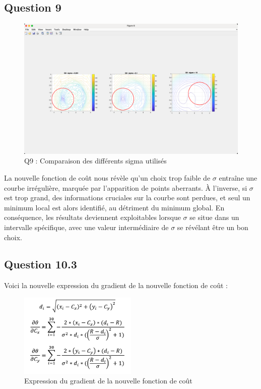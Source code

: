 \documentclass[12pt]{article}
\begin{document}
\subsection{Question 9}
\begin{figure}
    \centering
    \includegraphics[width=1\textwidth]{Q9.png} 
    \caption{Q9 : Comparaison des différents sigma utilisés}
\end{figure}
La nouvelle fonction de coût nous révèle qu’un choix trop faible de $\sigma$ entraîne une courbe irrégulière, marquée par l’apparition de points aberrants. À l’inverse, si $\sigma$ est trop grand, des informations cruciales sur la courbe sont perdues, et seul un minimum local est alors identifié, au détriment du minimum global. En conséquence, les résultats deviennent exploitables lorsque $\sigma$ se situe dans un intervalle spécifique, avec une valeur intermédiaire de $\sigma$ se révélant être un bon choix.

\subsection{Question 10.3}
Voici la nouvelle expression du gradient de la nouvelle fonction de coût :
\begin{figure}[H]
    \centering
    \includegraphics[width=0.5\textwidth]{Q10.3.png} 
    \caption{Expression du gradient de la nouvelle fonction de coût}
\end{figure}
\end{document}
